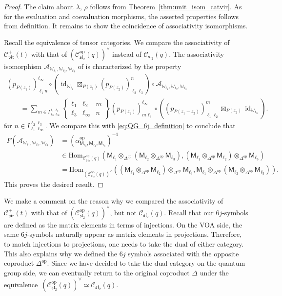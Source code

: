 \documentclass[pdftex]{sigma}
\numberwithin{equation}{section}
\newcommand{\Hom}{\mathrm{Hom}}
\newcommand{\id}{\operatorname{id}}
\newcommand{\op}{\mathrm{op}}
\newcommand{\cA}{\mathcal{A}}
\newcommand{\cC}{\mathcal{C}}
\newcommand{\fsl}{\mathfrak{sl}}
\newcommand{\sfM}{\mathsf{M}}
\newcommand{\QGirrep}[1]{\sfM_{#1}}
\newcommand{\QGcoprod}{\Delta}
\newcommand{\sixjsymb}[6]{
\left\{
\begin{array}{ccc}
 #1 & #2 & #5 \\
 #3 & #4 & #6
\end{array}
\right\}
}
\newcommand{\catQG}{\cC_{\fsl_{2}}}
\newcommand{\catVir}{\cC_{\vir}}
\newcommand{\Chan}[4]{I^{#1 #2}_{#3 #4}}
\newcommand{\virmod}{\mathbb{W}}
\newcommand{\vir}{\mathfrak{vir}}
\newcommand{\pzproj}[4]{(p_{P(#1)})_{#2 #3}^{#4}}
\begin{document}
\begin{proof}
The claim about $\lambda$, $\rho$ follows from Theorem~\ref{thm:unit_isom_catvir}.
As for the evaluation and coevaluation morphisms, the asserted properties follows from definition.
It remains to show the coincidence of associativity isomorphisms.

Recall the equivalence \smash{$\catQG (q) \simeq (\catQG^{\op}(q))^{\vee}$} of tensor categories.
We compare the associativity of $\catVir^{+}(t)$ with that of $(\catQG^{\op}(q))^{\vee}$ instead of $\catQG(q)$.
The associativity isomorphism $\cA_{\virmod_{\ell_{1}},\virmod_{\ell_{2}},\virmod_{\ell_{3}}}$ of \smash{$\catVir^{+}$} is characterized by the property
\begin{gather*}
 \pzproj{z_{1}}{\ell_{1}}{n}{\ell_{\infty}}\circ (\id_{\virmod_{\ell_{1}}}\boxtimes_{P(z_{1})}\pzproj{z_{2}}{\ell_{2}}{\ell_{3}}{n})\circ \cA_{\virmod_{\ell_{1}},\virmod_{\ell_{2}},\virmod_{\ell_{3}}} \\
 \qquad = \sum_{m\in \Chan{\ell_{1}}{\ell_{2}}{\ell_{3}}{\ell_{\infty}}}\sixjsymb{\ell_{1}}{\ell_{2}}{\ell_{3}}{\ell_{\infty}}{m}{n}\pzproj{z_{2}}{m}{\ell_{3}}{\ell_{\infty}}\circ (\pzproj{z_{1}-z_{2}}{\ell_{1}}{\ell_{2}}{m}\boxtimes_{P(z_{2})}\id_{\virmod_{\ell_{3}}}).
\end{gather*}
for $n\in \Chan{\ell_{2}}{\ell_{3}}{\ell_{1}}{\ell_{\infty}}$.
We compare this with \eqref{eq:QG_6j_definition} to conclude that
\begin{align*}
 F(\cA_{\virmod_{\ell_{1}},\virmod_{\ell_{2}},\virmod_{\ell_{3}}})&= (\alpha_{\QGirrep{\ell_{1}},\QGirrep{\ell_{2}},\QGirrep{\ell_{3}}}^{\op})^{-1}\\
 &\in \Hom_{\catQG^{\op}(q)}(\QGirrep{\ell_{1}}\otimes_{\QGcoprod^{\op}} (\QGirrep{\ell_{2}}\otimes_{\QGcoprod^{\op}}\QGirrep{\ell_{3}}),(\QGirrep{\ell_{1}}\otimes_{\QGcoprod^{\op}}\QGirrep{\ell_{2}})\otimes_{\QGcoprod^{\op}}\QGirrep{\ell_{3}}) \\
 &= \Hom_{(\catQG^{\op}(q))^{\vee}}((\QGirrep{\ell_{1}}\otimes_{\QGcoprod^{\op}}\QGirrep{\ell_{2}})\otimes_{\QGcoprod^{\op}}\QGirrep{\ell_{3}},\QGirrep{\ell_{1}}\otimes_{\QGcoprod^{\op}} (\QGirrep{\ell_{2}}\otimes_{\QGcoprod^{\op}}\QGirrep{\ell_{3}})).
\end{align*}
This proves the desired result.
\end{proof}

\begin{rem}
We make a comment on the reason why we compared the associativity of $\catVir^{+}(t)$ with that of $(\catQG^{\op}(q))^{\vee}$, but not $\catQG(q)$.
Recall that our $6j$-symbols are defined as the matrix elements in terms of injections.
On the VOA side, the same $6j$-symbols naturally appear as matrix elements in projections.
Therefore, to match injections to projections, one needs to take the dual of either category.
This also explains why we defined the $6j$ symbols associated with the opposite coproduct $\QGcoprod^{\op}$.
Since we have decided to take the dual category on the quantum group side, we can eventually return to the original coproduct $\QGcoprod$ under the equivalence~${(\catQG^{\op}(q))^{\vee}\simeq \catQG(q)}$.
\end{rem}
\end{document}
